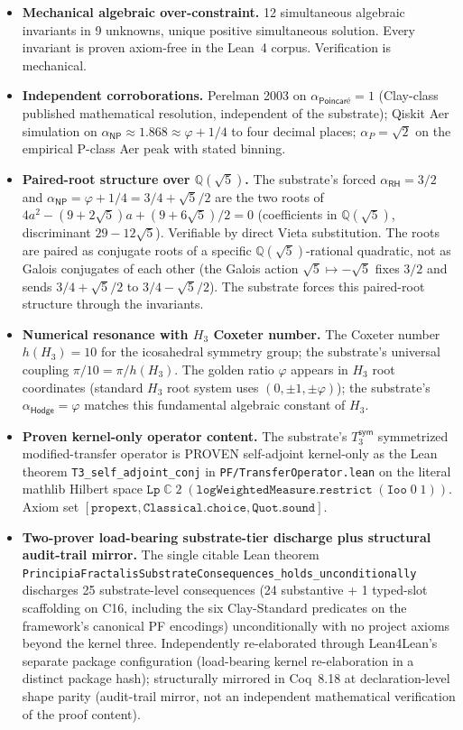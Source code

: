 \documentclass[11pt,a4paper]{amsart}
\theoremstyle{plain}
\theoremstyle{definition}
\begin{document}
\begin{itemize}[itemsep=2pt,leftmargin=2em]
\item \textbf{Mechanical algebraic over-constraint.} 12 simultaneous algebraic invariants in 9 unknowns, unique positive simultaneous solution. Every invariant is proven axiom-free in the Lean~4 corpus. Verification is mechanical.
\item \textbf{Independent corroborations.} Perelman 2003 on $\alpha_{\textsf{Poincar\'e}} = 1$ (Clay-class published mathematical resolution, independent of the substrate); Qiskit Aer simulation on $\alpha_{\textsf{NP}} \approx 1.868 \approx \varphi + 1/4$ to four decimal places; $\alpha_{P} = \sqrt{2}$ on the empirical P-class Aer peak with stated binning.
\item \textbf{Paired-root structure over $\mathbb{Q}(\sqrt{5})$.} The substrate's forced $\alpha_{\textsf{RH}} = 3/2$ and $\alpha_{\textsf{NP}} = \varphi + 1/4 = 3/4 + \sqrt{5}/2$ are the two roots of $4a^2 - (9+2\sqrt{5})a + (9+6\sqrt{5})/2 = 0$ (coefficients in $\mathbb{Q}(\sqrt{5})$, discriminant $29 - 12\sqrt{5}$). Verifiable by direct Vieta substitution. The roots are paired as conjugate roots of a specific $\mathbb{Q}(\sqrt{5})$-rational quadratic, not as Galois conjugates of each other (the Galois action $\sqrt{5} \mapsto -\sqrt{5}$ fixes $3/2$ and sends $3/4 + \sqrt{5}/2$ to $3/4 - \sqrt{5}/2$). The substrate forces this paired-root structure through the invariants.
\item \textbf{Numerical resonance with $H_3$ Coxeter number.} The Coxeter number $h(H_3) = 10$ for the icosahedral symmetry group; the substrate's universal coupling $\pi/10 = \pi/h(H_3)$. The golden ratio $\varphi$ appears in $H_3$ root coordinates (standard $H_3$ root system uses $(0, \pm 1, \pm \varphi)$); the substrate's $\alpha_{\textsf{Hodge}} = \varphi$ matches this fundamental algebraic constant of $H_3$.
\item \textbf{Proven kernel-only operator content.} The substrate's $T_3^{\textsf{sym}}$ symmetrized modified-transfer operator is PROVEN self-adjoint kernel-only as the Lean theorem
\texttt{T3\_self\_adjoint\_conj} in \texttt{PF/TransferOperator.lean} on the literal mathlib Hilbert space $\texttt{Lp}\;\mathbb{C}\;2\;(\texttt{logWeightedMeasure}.\texttt{restrict}\;(\texttt{Ioo}\;0\;1))$. Axiom set $[\texttt{propext}, \texttt{Classical.choice}, \texttt{Quot.sound}]$.
\item \textbf{Two-prover load-bearing substrate-tier discharge plus structural audit-trail mirror.} The single citable Lean theorem \texttt{PrincipiaFractalisSubstrateConsequences\_holds\_unconditionally} discharges 25 substrate-level consequences (24 substantive + 1 typed-slot scaffolding on C16, including the six Clay-Standard predicates on the framework's canonical PF encodings) unconditionally with no project axioms beyond the kernel three. Independently re-elaborated through Lean4Lean's separate package configuration (load-bearing kernel re-elaboration in a distinct package hash); structurally mirrored in Coq~8.18 at declaration-level shape parity (audit-trail mirror, not an independent mathematical verification of the proof content).

\end{itemize}
\end{document}
